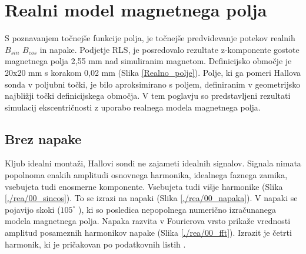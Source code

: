 

\chapter{Realni model magnetnega polja}



S poznavanjem točnejše funkcije polja, je točnejše predvidevanje potekov realnih $B_{sin}$ $B_{cos}$ in napake. Podjetje RLS,  je posredovalo rezultate z-komponente gostote magnetnega polja 2,55 mm nad simuliranim magnetom.  Definicijsko območje  je 20x20 mm s korakom 0,02 mm (Slika \ref{Realno_polje}).
Polje, ki ga pomeri Hallova sonda v poljubni točki, je bilo aproksimirano s poljem, definiranim v geometrijsko najbližji točki definicijskega območja.%
V tem poglavju so predstavljeni rezultati simulacij ekscentričnosti z uporabo realnega modela magnetnega polja.

\section{Brez napake}
Kljub idealni montaži, Hallovi sondi ne zajameti idealnih signalov. Signala nimata popolnoma enakih amplitudi osnovnega harmonika, idealnega faznega zamika, vsebujeta tudi enosmerne komponente. Vsebujeta tudi višje harmonike (Slika \ref{./rea/00_sincos}). To se izrazi na napaki (Slika \ref{./rea/00_napaka}). V napaki se pojavijo skoki ($105^{\circ}$ ), ki so posledica nepopolnega numerično izračunanega modela magnetnega polja. Napaka razvita v Fourierova vrsto prikaže vrednosti amplitud posameznih harmonikov napake (Slika \ref{./rea/00_fft}). Izrazit je četrti harmonik, ki je pričakovan po podatkovnih listih \cite{AM8192}.
\newpage
